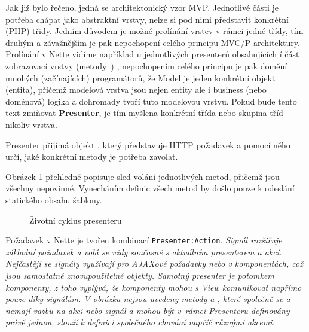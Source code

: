 Jak již bylo řečeno, jedná se architektonický vzor MVP. 
Jednotlivé části je potřeba chápat jako abstraktní vrstvy, nelze si pod nimi představit konkrétní (PHP) třidy.
Jedním důvodem je možné prolínání vrstev v rámci jedné třídy, tím druhým a závažnějším je pak nepochopení celého principu MVC/P architektury. Prolínání v Nette vidíme například u jednotlivých presenterů obsahujících í část zobrazovací vrstvy (metody~) 
, nepochopením celého principu je pak domění mnohých (začínajících) programátorů, že Model je jeden konkrétní objekt (entita), přičemž modelová vrstva jsou nejen entity ale i business (nebo doménová) logika a dohromady tvoří tuto modelovou vrstvu. Pokud bude tento text zmiňovat \textbf{Presenter}, je tím myšlena konkrétní třída nebo skupina tříd nikoliv vrstva.


Presenter přijímá objekt , který představuje HTTP požadavek a pomocí něho určí, jaké konkrétní metody je potřeba zavolat. 

Obrázek \ref{fig:zivotniCyklusPresenteru} přehledně popisuje sled volání jednotlivých metod, přičemž jsou všechny nepovinné. Vynecháním definic všech metod by došlo pouze k odeslání statického obsahu šablony.

\begin{figure}[h]
		\centering \tiny {}\selectfont
		\def\scgscale{1}
		
		\normalsize \sffamily
		\captionsetup{width=\linewidth}
		\caption{Životní cyklus presenteru}
		\label{fig:zivotniCyklusPresenteru}
\end{figure}

Požadavek v Nette je tvořen kombinací \texttt{Presenter:Action}. \it{Signál} rozšiřuje základní požadavek a volá se vždy současně s aktuálním presenterem a akcí. Nejčastěji se signály využívají pro AJAXové požadavky nebo v komponentách, což jsou samostatné znovupoužitelné objekty. Samotný presenter je potomkem komponenty, z toho vyplývá, že komponenty mohou s View komunikovat napřímo pouze díky signálům. V obrázku nejsou uvedeny metody  a , které společně se  a  nemají vazbu na \it{akci} nebo \it{signál} a mohou být v~rámci Presenteru definovány právě jednou, slouží k definici společného chování napříč různými akcemi.


